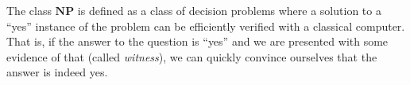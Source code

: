 The class $\mathbf{NP}$ is defined as a class of decision problems where a solution to a ``yes'' instance of the problem can be efficiently verified with a classical computer. That is, if the answer to the question is ``yes'' and we are presented with some evidence of that (called \textit{witness}), we can quickly convince ourselves that the answer is indeed yes.





